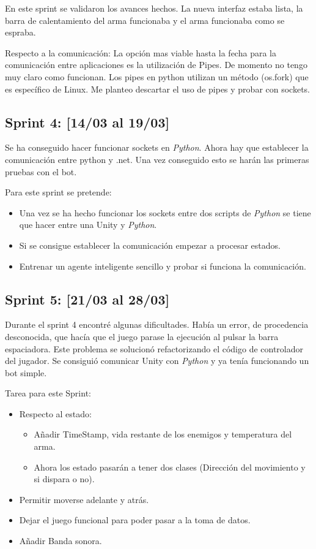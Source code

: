 En este sprint se validaron los avances hechos. La nueva interfaz estaba lista, la barra de calentamiento del arma funcionaba y el arma funcionaba como se espraba.

Respecto a la comunicación:
La opción mas viable hasta la fecha para la comunicación entre aplicaciones es la utilización de Pipes. De momento no tengo muy claro como funcionan. Los pipes en python utilizan un método (os.fork) que es específico de Linux. Me planteo descartar el uso de pipes y probar con sockets.


\subsection{Sprint 4:  [14/03 al 19/03]}

Se ha conseguido hacer funcionar sockets en \emph{Python}. Ahora hay que establecer la comunicación entre python y .net. Una vez conseguido esto se harán las primeras pruebas con el bot.

Para este sprint se pretende:
\begin{itemize}
    \item Una vez se ha hecho funcionar los sockets entre dos scripts de \emph{Python} se tiene que hacer entre una Unity y \emph{Python}.
    \item Si se consigue establecer la comunicación empezar a procesar estados.
    \item Entrenar un agente inteligente sencillo y probar si funciona la comunicación.
\end{itemize}



\subsection{Sprint 5: [21/03 al 28/03]}

Durante el sprint 4 encontré algunas dificultades. Había un error, de procedencia desconocida, que hacía que el juego parase la ejecución al pulsar la barra espaciadora. Este problema se solucionó refactorizando el código de controlador del jugador. Se consiguió comunicar Unity con \emph{Python} y ya tenía funcionando un bot simple.

Tarea para este Sprint: 
\begin{itemize}
    \item Respecto al estado:
    \begin{itemize}
        \item Añadir TimeStamp, vida restante de los enemigos y temperatura del arma.
        \item Ahora los estado pasarán a tener dos clases (Dirección del movimiento y si dispara o no).
    \end{itemize}
    \item Permitir moverse adelante y atrás.
    \item Dejar el juego funcional para poder pasar a la toma de datos.
    \item Añadir Banda sonora.
\end{itemize}


